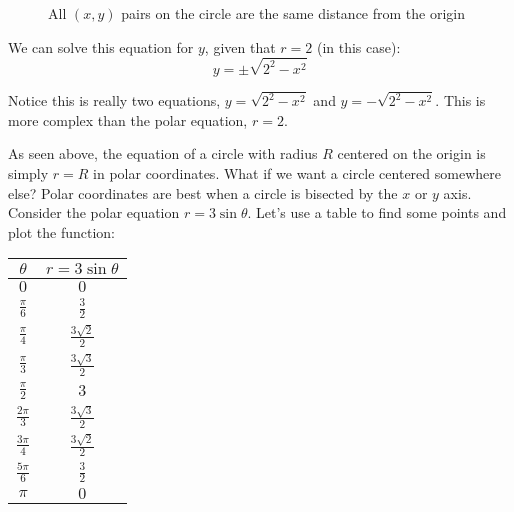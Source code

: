 \begin{figure}[htbp]
\centering
    \caption{All $(x,y)$ pairs on the circle are the same distance from the origin}
    \label{fig:circle2}
    \end{figure}
    
We can solve this equation for $y$, given that $r = 2$ (in this case):
$$y = \pm \sqrt{2^2 - x^2}$$

Notice this is really two equations, $y = \sqrt{2^2 - x^2}$ and $y = -\sqrt{
2^2 - x^2}$. This is more complex than the polar equation, $r = 2$. 

As seen above, the equation of a circle with radius $R$ centered on the origin 
is simply $r = R$ in polar coordinates. What if we want a circle centered 
somewhere else? Polar coordinates are best when a circle is bisected by the 
$x$ or $y$ axis. Consider the polar equation $r = 3 \sin{\theta}$. Let's use a 
table to find some points and plot the function:

\begin{center}
\begin{tabular}{|c|c|}\hline
$\theta$ & $r = 3 \sin{\theta}$\\\hline
$0$ & $0$\\\hline
$\frac{\pi}{6}$ & $\frac{3}{2}$\\\hline
$\frac{\pi}{4}$ & $\frac{3\sqrt{2}}{2}$\\\hline
$\frac{\pi}{3}$ & $\frac{3\sqrt{3}}{2}$\\\hline
$\frac{\pi}{2}$ & $3$\\\hline
$\frac{2\pi}{3}$ & $\frac{3\sqrt{3}}{2}$\\\hline
$\frac{3\pi}{4}$ & $\frac{3\sqrt{2}}{2}$\\\hline
$\frac{5\pi}{6}$ & $\frac{3}{2}$\\\hline
$\pi$ & $0$\\\hline
\end{tabular}
\end{center}



